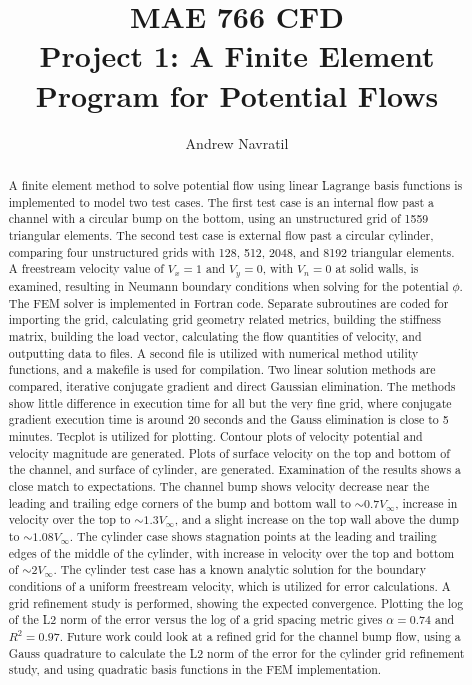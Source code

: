 \documentclass[conf]{new-aiaa}
\title{MAE 766 CFD\\Project 1: A Finite Element Program for Potential Flows}
\author{Andrew Navratil}
\begin{document}
\maketitle

\begin{abstract}
	A finite element method to solve potential flow using linear Lagrange basis functions is implemented to model two test cases.  The first test case is an internal flow past a channel with a circular bump on the bottom, using an unstructured grid of 1559 triangular elements.  The second test case is external flow past a circular cylinder, comparing four unstructured grids with 128, 512, 2048, and 8192 triangular elements.  A freestream velocity value of $V_x=1$ and $V_y=0$, with $V_n = 0$ at solid walls, is examined, resulting in Neumann boundary conditions when solving for the potential $\phi$.
	The FEM solver is implemented in Fortran code.  Separate subroutines are coded for importing the grid, calculating grid geometry related metrics, building the stiffness matrix, building the load vector, calculating the flow quantities of velocity, and outputting data to files.  A second file is utilized with numerical method utility functions, and a makefile is used for compilation.  Two linear solution methods are compared, iterative conjugate gradient and direct Gaussian elimination.  The methods show little difference in execution time for all but the very fine grid, where conjugate gradient execution time is around 20 seconds and the Gauss elimination is close to 5 minutes.
	Tecplot is utilized for plotting.  Contour plots of velocity potential and velocity magnitude are generated.  Plots of surface velocity on the top and bottom of the channel, and surface of cylinder, are generated.  Examination of the results shows a close match to expectations.  The channel bump shows velocity decrease near the leading and trailing edge corners of the bump and bottom wall to ${\sim}0.7V_{\infty}$, increase in velocity over the top to ${\sim}1.3V_{\infty}$, and a slight increase on the top wall above the dump to ${\sim}1.08V_{\infty}$.  The cylinder case shows stagnation points at the leading and trailing edges of the middle of the cylinder, with increase in velocity over the top and bottom of ${\sim}2V_{\infty}$.  The cylinder test case has a known analytic solution for the boundary conditions of a uniform freestream velocity, which is utilized for error calculations.  A grid refinement study is performed, showing the expected convergence.  Plotting the log of the L2 norm of the error versus the log of a grid spacing metric gives $\alpha = 0.74$ and $R^2 = 0.97$.
	Future work could look at a refined grid for the channel bump flow, using a Gauss quadrature to calculate the L2 norm of the error for the cylinder grid refinement study, and using quadratic basis functions in the FEM implementation. 

\end{abstract}
\end{document}
